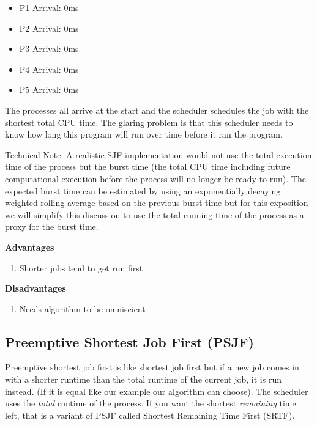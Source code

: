 \begin{itemize}
\tightlist
\item
  P1 Arrival: 0ms
\item
  P2 Arrival: 0ms
\item
  P3 Arrival: 0ms
\item
  P4 Arrival: 0ms
\item
  P5 Arrival: 0ms
\end{itemize}

The processes all arrive at the start and the scheduler schedules the job with the shortest total CPU time. The glaring problem is that this scheduler needs to know how long this program will run over time before it ran the program.

Technical Note: A realistic SJF implementation would not use the total execution time of the process but the burst time (the total CPU time including future computational execution before the process will no longer be ready to run). The expected burst time can be estimated by using an exponentially decaying weighted rolling average based on the previous burst time but for this exposition we will simplify this discussion to use the total running time of the process as a proxy for the burst time.

\textbf{Advantages} 

\begin{enumerate}
  \item Shorter jobs tend to get run first
\end{enumerate}

\textbf{Disadvantages} 
\begin{enumerate}
  \item Needs algorithm to be omniscient
\end{enumerate}

\subsection{Preemptive Shortest Job First (PSJF)}

Preemptive shortest job first is like shortest job first but if a new job comes in with a shorter runtime than the total runtime of the current job, it is run instead. (If it is equal like our example our algorithm can choose). The scheduler uses the \emph{total} runtime of the process. If you want the shortest \emph{remaining} time left, that is a variant of PSJF called Shortest Remaining Time First (SRTF).

